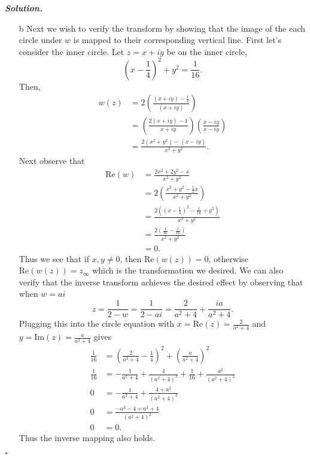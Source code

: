 \documentclass[12pt]{report}
\newenvironment{solution}[1][\it{Solution}]{\textbf{#1. } }{$\square$}
\newcommand{\paren}[1]{{\left(#1\right)}} %
\begin{document}
\begin{solution}
\begin{enumerate}
        \item[b] 
        Next we wish to verify the transform by showing that the image of the each circle under $w$ is mapped to their corresponding vertical line. First let's consider the inner circle. Let $z = x + i y$ be on the inner circle,
        \[ (x - \frac{1}{4})^2 + y^2 = \frac{1}{16}.\]
        Then,
        \begin{align*}
            w(z) &= 2 \paren{ \frac{(x + iy) - \frac{1}{2}}{(x + iy)}}\\
            &= \paren{ \frac{2(x + iy) - 1}{x + iy} } \paren{ \frac{x - iy}{x - iy}}\\
            &= \frac{2(x^2 + y^2) - (x - iy)}{x^2 + y^2}.
        \end{align*} 
        Next observe that
        \begin{align*}
            \mathrm{Re}(w) &= \frac{2x^2 + 2y^2 - x}{x^2 + y^2}\\
            &= 2 \paren{ \frac{x^2 + y^2 - \frac{1}{2}x }{x^2 + y^2}}\\
            &= \frac{2((x - \frac{1}{4})^2 - \frac{1}{16} + y^2)}{x^2 + y^2}\\
            &= \frac{2(\frac{1}{16} - \frac{1}{16})}{x^2 + y^2}\\
            &= 0.
        \end{align*}
        Thus we see that if $x,y \neq 0$, then $\mathrm{Re}(w(z)) = 0$, otherwise $\mathrm{Re}(w(z)) = z_\infty$ which is the transformation we desired. We can also verify that the inverse transform achieves the desired effect by observing that when $w = ai$
        \[
            z = \frac{1}{2-w} = \frac{1}{2-ai} = \frac{2}{a^2 + 4} + \frac{i a}{a^2 + 4}.
        \]
        Plugging this into the circle equation with $x = \mathrm{Re}(z) = \frac{2}{a^2 + 4}$ and $y = \mathrm{Im}(z) = \frac{a}{a^2 + 4}$ gives
        \begin{align*}
            \frac{1}{16} &= \paren{\frac{2}{a^2 + 4} - \frac{1}{4}}^2 + \paren{\frac{a}{a^2 + 4}}^2\\
            \frac{1}{16} &= - \frac{1}{a^2 + 4} + \frac{4}{(a^2 + 4)^2} + \frac{1}{16} + \frac{a^2}{(a^2 + 4)^2}\\
            0 &= - \frac{1}{a^2 + 4} + \frac{4 + a^2}{(a^2 + 4)^2}\\
            0 &= \frac{-a^2 - 4 + a^2 +4}{(a^2 + 4)^2}\\
            0 &= 0.
        \end{align*} 
        Thus the inverse mapping also holds. 


\end{enumerate}
\end{solution}
\end{document}
